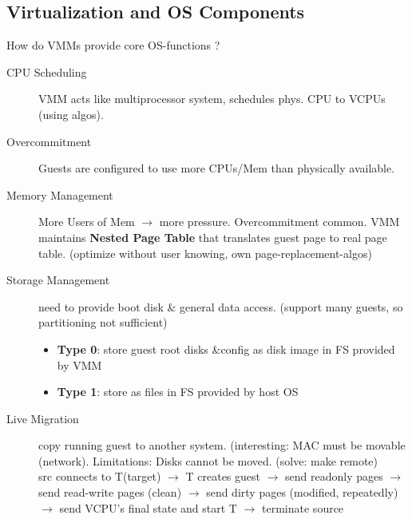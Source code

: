 \subsection*{Virtualization and OS Components}
How do VMMs provide core OS-functions ?
\begin{description}
    \item[CPU Scheduling]VMM acts like multiprocessor system, schedules phys. CPU to VCPUs (using algos). %
    \item[Overcommitment]Guests are configured to use more CPUs/Mem than physically available.
    \item[Memory Management] More Users of Mem $\rightarrow$ more pressure. Overcommitment common. VMM maintains \textbf{Nested Page Table} that translates guest page to real page table. (optimize without user knowing, own page-replacement-algos)
    \item[Storage Management] need to provide boot disk \& general data access. (support many guests, so partitioning not sufficient)
        \begin{itemize}[label={}, labelsep=0pt]
            \item \textbf{Type 0}: store guest root disks \&config as disk image in FS provided by VMM
            \item \textbf{Type 1}: store as files in FS provided by host OS %
        \end{itemize}
    \item[Live Migration]copy running guest to another system. (interesting: MAC must be movable (network). Limitations: Disks cannot be moved. (solve: make remote) \\
    src connects to T(target) $\rightarrow$ T creates guest $\rightarrow$ send readonly pages $\rightarrow$ send read-write pages (clean) $\rightarrow$ send dirty pages (modified, repeatedly) $\rightarrow$ send VCPU's final state and start T $\rightarrow$ terminate source
\end{description}
